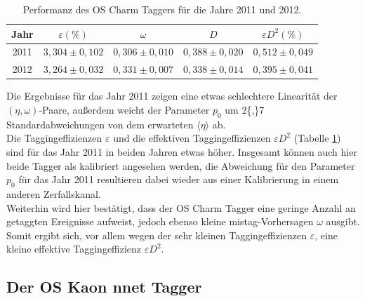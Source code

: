 \begin{table}[htbp]
	\centering
	\caption{Performanz des OS Charm Taggers für die Jahre \num{2011} und \num{2012}.}
	\label{tab:performance_OSCharm}
	\begin{tabular}{ccccc}
	\toprule
       Jahr & $\varepsilon(\%)$ & $\omega$ & $D$ & $\varepsilon D^2(\%)$ \\ 
       \midrule
      2011 & $3{,}304\pm0{,}102$ & $0{,}306\pm0{,}010$ & $0{,}388\pm0{,}020$ & $0{,}512\pm0{,}049$\\ 
   2012 & $3{,}264\pm0{,}032$ & $0{,}331\pm0{,}007$ & $0{,}338\pm0{,}014$ & $0{,}395\pm0{,}041$\\ 
   \bottomrule
  \end{tabular}
\end{table}
Die Ergebnisse für das Jahr \num{2011} zeigen eine etwas schlechtere Linearität der $(\eta,\omega)$-Paare, außerdem weicht der Parameter $p_0$ um \num{2{,}7} Standardabweichungen von dem erwarteten $\langle\eta\rangle$ ab.\\
Die Taggingeffizienzen $\varepsilon$ und die effektiven Taggingeffizienzen $\varepsilon D^2$  (Tabelle \ref{tab:performance_OSCharm}) sind für das Jahr \num{2011} in beiden Jahren etwas höher. Insgesamt können auch hier beide Tagger als kalibriert angesehen werden, die Abweichung für den Parameter $p_0$ für das Jahr \num{2011} resultieren dabei wieder aus einer Kalibrierung in einem anderen Zerfallskanal.\\
Weiterhin wird hier bestätigt, dass der OS Charm Tagger eine geringe Anzahl an getaggten Ereignisse aufweist, jedoch ebenso kleine mistag-Vorhersagen $\omega$ ausgibt. Somit ergibt sich, vor allem wegen der sehr kleinen Taggingeffizienzen $\varepsilon$, eine kleine effektive Taggingeffizienz $\varepsilon D^2$. 

\subsection{Der OS Kaon nnet Tagger}

